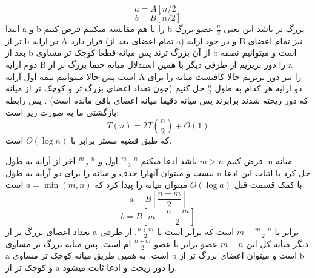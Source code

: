 \problem{}
\subproblem{}
 \[ a = A[n/2] \]
 \[ b = B[n/2] \]
 ابتدا a و b را با هم مقایسه میکنیم
 فرض کنیم b بزرگ تر باشد
 این یعنی $\frac{n}{2}$
 عضو بزرگ تر از b در ارایه A قرار دارد (تمام اعضای بعد از a)
 و در خود ارایه B نیز تمام اعضای بعد از b از آن بزرگ ترند
 پس میانه قطعا کوچک تر مساوی b است و میتوانیم نصفه دوم آرایه 
 ‌B را دور بریزیم
 از طرفی دیگر با همین استدلال میانه حتما بزرگ تر از a است پس حالا میتوانیم
 نیمه اول آرایه A را نیز دور بریزیم
 حالا کافیست میانه را برای دو ارایه هر کدام به طول $\frac{n}{2}$
 حل کنیم (چون تعداد اعضای بزرگ تر و کوچک تر از میانه که دور ریخته شدند برابرند پس میانه دقیقا میانه اعضای باقی مانده است)
 .
 پس رابطه بازگشتی ما به صورت زیر است:
\[ T(n) = 2T(\frac{n}{2}) + O(1)\]
که طبق قضیه مستر برابر با $O(\log{n})$ است.

\subproblem{}
فرض کنیم $m>n$ باشد
ادعا میکنم $\frac{m-n}{2}$ اول و 
$\frac{m-n}{2}$ اخر از آرایه به طول m
میانه نیست و میتوان آنهارا حذف و میانه را برای دو آرایه به طول n حل کرد
با اثبات این ادعا با کمک قسمت قبل $O(\log{a})$
میتوان میانه را پیدا کرد که $a = \min(m,n)$ است.
\proof{}
\[ a = B[\frac{n-m}{2}]\]
\[ b = B[m -\frac{n-m}{2}]\]
تعداد اعضای بزرگ تر از a برابر با $m -\frac{m-n}{2}$ است که برابر است با
$\frac{n+m}{2}$.
از طرفی دیگر میانه کل این $m+n$ عضو برابر با عضو
$\frac{n+m}{2}$ ام است.
پس میانه بزرگ تر مساوی a است.
به همین طریق میانه کوچک تر مساوی b است و میتوان اعضای بزرگ تر از b 
و کوچک تر از a را دور ریخت و ادعا ثابت میشود.


